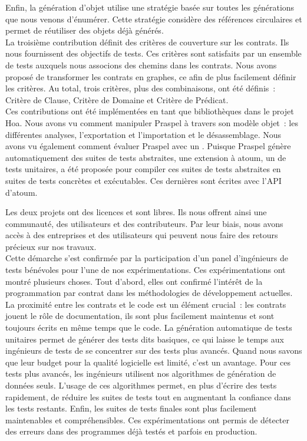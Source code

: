 Enfin, la génération d'objet utilise une stratégie basée sur toutes les
générations que nous venons d'énumérer. Cette stratégie considère des références
circulaires et permet de réutiliser des objets déjà générés. \\

La troisième contribution définit des critères de couverture sur les contrats.
Ils nous fournissent des objectifs de tests. Ces critères sont satisfaits par un
ensemble de tests auxquels nous associons des chemins dans les contrats. Nous
avons proposé de transformer les contrats en graphes, ce afin de plus facilement
définir les critères. Au total, trois critères, plus des combinaisons, ont été
définis~: Critère de Clause, Critère de Domaine et Critère de Prédicat. \\

Ces contributions ont été implémentées en tant que bibliothèques dans le projet
Hoa. Nous avons vu comment manipuler Praspel à travers son modèle objet~: les
différentes analyses, l'exportation et l'importation et le désassemblage. Nous
avons vu également comment évaluer Praspel avec un . Puisque Praspel génère automatiquement des suites de tests
abstraites, une extension à atoum, un  de tests unitaires,
a été proposée pour compiler ces suites de tests abstraites en suites de tests
concrètes et exécutables. Ces dernières sont écrites avec l'API d'atoum.

Les deux projets ont des licences  et sont libres. Ils
nous offrent ainsi une communauté, des utilisateurs et des contributeurs. Par
leur biais, nous avons accès à des entreprises et des utilisateurs qui peuvent
nous faire des retours précieux sur nos travaux. \\

Cette démarche s'est confirmée par la participation d'un panel d'ingénieurs de
tests bénévoles pour l'une de nos expérimentations. Ces expérimentations ont
montré plusieurs choses. Tout d'abord, elles ont confirmé l'intérêt de la
programmation par contrat dans les méthodologies de développement actuelles. La
proximité entre les contrats et le code est un élément crucial~: les contrats
jouent le rôle de documentation, ils sont plus facilement maintenus et sont
toujours écrits en même temps que le code. La génération automatique de tests
unitaires permet de générer des tests dits basiques, ce qui laisse le temps aux
ingénieurs de tests de se concentrer sur des tests plus avancés. Quand nous
savons que leur budget pour la qualité logicielle est limité, c'est un avantage.
Pour ces tests plus avancés, les ingénieurs utilisent nos algorithmes de
génération de données seuls. L'usage de ces algorithmes permet, en plus d'écrire
des tests rapidement, de réduire les suites de tests tout en augmentant la
confiance dans les tests restants. Enfin, les suites de tests finales sont plus
facilement maintenables et compréhensibles. Ces expérimentations ont permis de
détecter des erreurs dans des programmes déjà testés et parfois en production.
\\

